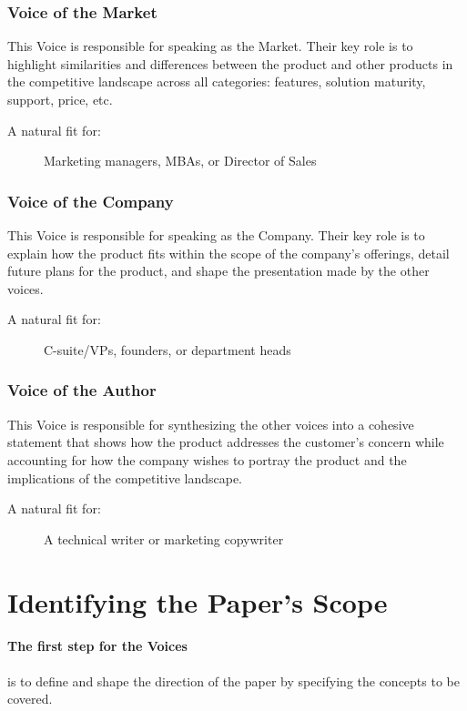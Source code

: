 \documentclass[letterpaper]{article}
\begin{document}
    \subsubsection{Voice of the Market}
    This Voice is responsible for speaking as the Market. Their key role is to highlight similarities and differences between the product and other products in the competitive landscape across all categories: features, solution maturity, support, price, etc.
    \begin{description}
        \item[A natural fit for:] Marketing managers, MBAs, or Director of Sales
    \end{description}

    \subsubsection{Voice of the Company}
    This Voice is responsible for speaking as the Company. Their key role is to explain how the product fits within the scope of the company's offerings, detail future plans for the product, and shape the presentation made by the other voices.
    \begin{description}
        \item[A natural fit for:] C-suite/VPs, founders, or department heads
    \end{description}

    \subsubsection{Voice of the Author}
    This Voice is responsible for synthesizing the other voices into a cohesive statement that shows how the product addresses the customer's concern while accounting for how the company wishes to portray the product and the implications of the competitive landscape.
    \begin{description}
        \item[A natural fit for:] A technical writer or marketing copywriter
    \end{description}


\section{Identifying the Paper's Scope}\label{topic:scope}
\paragraph{The first step for the Voices} is to define and shape the direction of the paper by specifying the concepts to be covered. 
\end{document}
